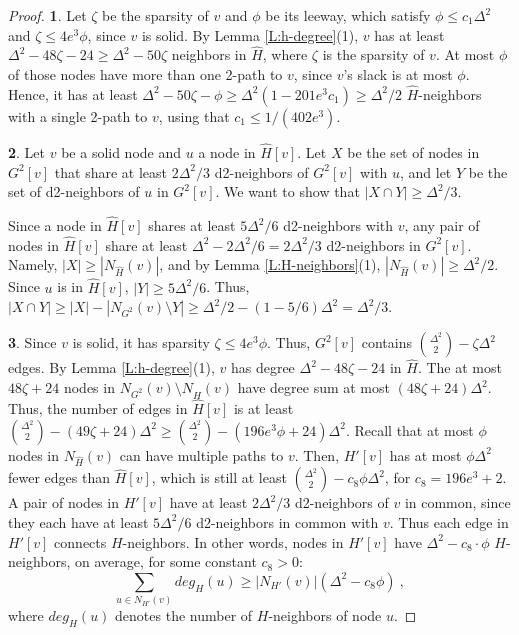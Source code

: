 \begin{proof}
\textbf{1}. Let $\zeta$ be the sparsity of $v$ and $\phi$ be its leeway, which satisfy $\phi \le c_1 \Delta^2$ and $\zeta \le 4e^3\phi$, since $v$ is solid.
By Lemma \ref{L:h-degree}(1), $v$ has at least $\Delta^2 - 48\zeta - 24 \ge \Delta^2 - 50\zeta$ neighbors in $\hat{H}$, where $\zeta$ is the sparsity of $v$. At most $\phi$ of those nodes have more than one 2-path to $v$, since $v$'s slack is at most $\phi$. Hence, it has at least $\Delta^2 - 50\zeta - \phi \ge \Delta^2(1 - 201 e^3 c_1) \ge \Delta^2/2$ $\hat{H}$-neighbors with a single 2-path to $v$, using that $c_1 \le 1/(402 e^3)$.

\textbf{2}. 
Let $v$ be a solid node and $u$ a node in $\hat{H}[v]$. Let $X$ be the set of nodes in $G^2[v]$ that share at least $2\Delta^2/3$ d2-neighbors of $G^2[v]$ with $u$, and let $Y$ be the set of d2-neighbors of $u$ in $G^2[v]$.
We want to show that $|X \cap Y| \ge \Delta^2/3$.

Since a node in $\hat{H}[v]$ shares at least $5\Delta^2/6$ d2-neighbors with $v$, any pair of nodes in $\hat{H}[v]$ share at least $\Delta^2 - 2\Delta^2/6 = 2\Delta^2/3$ d2-neighbors in $G^2[v]$. Namely, $|X| \ge |N_{\hat{H}}(v)|$, and by Lemma \ref{L:H-neighbors}(1), $|N_{\hat{H}}(v)| \ge \Delta^2/2$. 
Since $u$ is in $\hat{H}[v]$, $|Y| \ge 5\Delta^2/6$.
Thus, $|X \cap Y| \ge |X| - |N_{G^2}(v)\setminus Y| \ge \Delta^2/2 - (1-5/6)\Delta^2 = \Delta^2/3$.

\textbf{3}. 
Since $v$ is solid, it has sparsity $\zeta \le 4e^3 \phi$. Thus, $G^2[v]$ contains $\binom{\Delta^2}{2} - \zeta \Delta^2$ edges. 
By Lemma \ref{L:h-degree}(1), $v$ has degree $\Delta^2 - 48\zeta - 24$ in $\hat{H}$. The at most 
$48\zeta+24$ nodes in $N_{G^2}(v) \setminus N_{\hat{H}}(v)$ have degree sum at most $(48\zeta+24) \Delta^2$. Thus, the number of edges in $\hat{H}[v]$ is at least  
$\binom{\Delta^2}{2} - (49\zeta +24)\Delta^2 \ge \binom{\Delta^2}{2} - (196e^3\phi+24)\Delta^2$.
Recall that at most $\phi$ nodes in $N_{\hat{H}}(v)$ can have multiple paths to $v$. 
Then, $H'[v]$ has at most $\phi \Delta^2$ fewer edges than $\hat{H}[v]$, which is still at least $\binom{\Delta^2}{2} - c_8\phi\Delta^2$, for $c_8 = 196e^3+2$. A pair of nodes in $H'[v]$ have at least $2\Delta^2/3$ d2-neighbors of $v$ in common, since they each have at least $5\Delta^2/6$ d2-neighbors in common with $v$. Thus each edge in $H'[v]$ connects $H$-neighbors. In other words, nodes in $H'[v]$ have $\Delta^2 - c_8 \cdot \phi$ $H$-neighbors, on average, for some constant $c_8 > 0$: 
\[ \sum_{u \in N_{H'}(v)} deg_H(u) \ge |N_{H'}(v)| (\Delta^2 - c_8\phi)\ , \]
where $deg_{H}(u)$ denotes the number of $H$-neighbors of node $u$. 
\end{proof}

